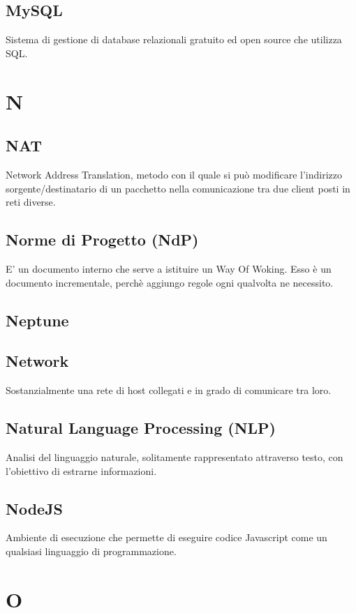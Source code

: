 \documentclass{classes/base}
\begin{document}
        \subsection*{MySQL}
        Sistema di gestione di database relazionali gratuito ed open source che utilizza SQL.
        \newpage  
    \section{N}
        \subsection*{NAT}
        Network Address Translation, metodo con il quale si può modificare l'indirizzo sorgente/destinatario di un pacchetto nella comunicazione tra due client posti in reti diverse.

        \subsection*{Norme di Progetto (NdP)} 
        E' un documento interno che serve a istituire un Way Of Woking. Esso è un documento incrementale, perchè aggiungo regole ogni qualvolta ne necessito.
        
        \subsection*{Neptune}

        \subsection*{Network}
        Sostanzialmente una rete di host collegati e in grado di comunicare tra loro.

        \subsection*{Natural Language Processing (NLP)}
        Analisi del linguaggio naturale, solitamente rappresentato attraverso testo, con l'obiettivo di estrarne informazioni.

        \subsection*{NodeJS}
        Ambiente di esecuzione che permette di eseguire codice Javascript come un qualsiasi linguaggio di programmazione.
        \newpage  
    \section{O}
\end{document}
